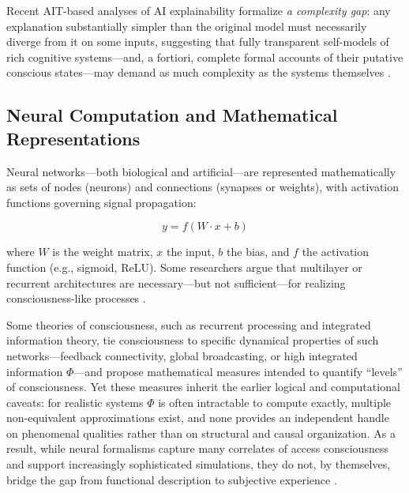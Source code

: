 Recent AIT-based analyses of AI explainability formalize \emph{a complexity gap}: any explanation substantially simpler than the original model must necessarily diverge from it on some inputs, suggesting that fully transparent self-models of rich cognitive systems---and, a fortiori, complete formal accounts of their putative conscious states---may demand as much complexity as the systems themselves \cite{li2019introduction,rao2025limits,ruffini2017algorithmic}.

\subsection{Neural Computation and Mathematical Representations}
\label{subsec:neural_computation}

Neural networks---both biological and artificial---are represented mathematically as sets of nodes (neurons) and connections (synapses or weights), with activation functions governing signal propagation:

\vspace{-2.0\baselineskip}
\begin{equation}
y = f(W \cdot x + b)
\label{eq:neural_activation}
\end{equation}
\vspace{-2.0\baselineskip}

where $W$ is the weight matrix, $x$ the input, $b$ the bias, and $f$ the activation function (e.g., sigmoid, ReLU). Some researchers argue that multilayer or recurrent architectures are necessary---but not sufficient---for realizing consciousness-like processes \cite{lamme2006towards,tononi2004information}. 

Some theories of consciousness, such as recurrent processing and integrated information theory, tie consciousness to specific dynamical properties of such networks---feedback connectivity, global broadcasting, or high integrated information $\Phi$---and propose mathematical measures intended to quantify ``levels'' of consciousness. Yet these measures inherit the earlier logical and computational caveats: for realistic systems $\Phi$ is often intractable to compute exactly, multiple non-equivalent approximations exist, and none provides an independent handle on phenomenal qualities rather than on structural and causal organization. As a result, while neural formalisms capture many correlates of access consciousness and support increasingly sophisticated simulations, they do not, by themselves, bridge the gap from functional description to subjective experience \cite{garridomerchan2024machine,qin2025taxonomy,reggia2013rise,ruffini2017algorithmic}.

